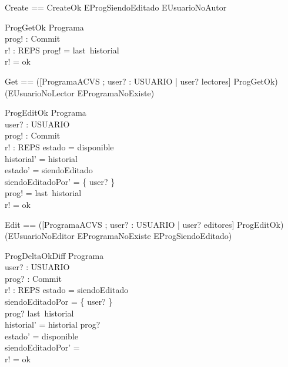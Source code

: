 \documentclass[11pt]{article}
\begin{document}
  \begin{zed}
    Create == CreateOk \lor EProgSiendoEditado \lor EUsuarioNoAutor
  \end{zed}
  
  \begin{schema}{ProgGetOk}
  \Xi Programa \\
  prog! : Commit \\
  r! : REPS
  \where
  prog! = last~historial \\
  r! = ok
  \end{schema}
  
  \begin{zed}
  Get == ([ProgramaACVS ; user? : USUARIO | user? \in lectores] \land ProgGetOk) \\
  \lor (EUsuarioNoLector \lor EProgramaNoExiste)
  \end{zed}
  
  \begin{schema}{ProgEditOk}
  \Delta Programa \\
  user? : USUARIO \\
  prog! : Commit \\
  r! : REPS
  \where
  estado = disponible \\
  historial' = historial \\
  estado' = siendoEditado \\
  siendoEditadoPor' = \{ user? \} \\
  prog! = last~historial \\
  r! = ok
  \end{schema}
  
  \begin{zed}
  Edit == ([ProgramaACVS ; user? : USUARIO | user? \in editores] \land ProgEditOk) \lor \\
  (EUsuarioNoEditor \lor EProgramaNoExiste \lor EProgSiendoEditado)
  \end{zed}
  
  \begin{schema}{ProgDeltaOkDiff}
  \Delta Programa \\
  user? : USUARIO \\
  prog? : Commit \\
  r! : REPS 
  \where
  estado = siendoEditado \\
  siendoEditadoPor = \{ user? \} \\
  prog? \neq last~historial \\
  historial' = historial \cat \langle prog? \rangle \\
  estado' = disponible \\
  siendoEditadoPor' = \emptyset \\
  r! = ok
  \end{schema}
  
\end{document}
